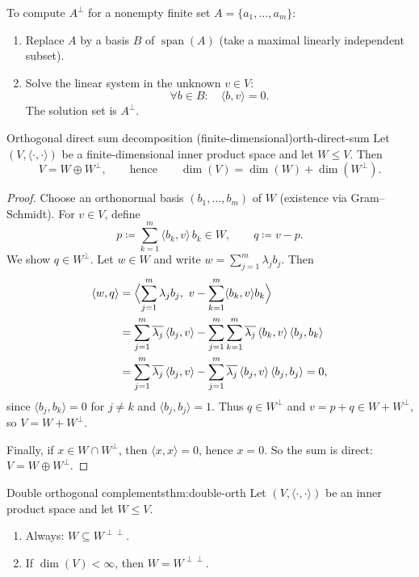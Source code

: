 \begin{keyformula}[title={Key Procedure (Lecture Week 12): finding $A^\perp$ for a finite set $A$}]
To compute $A^\perp$ for a nonempty finite set $A=\{a_1,\dots,a_m\}$:
\begin{enumerate}[leftmargin=*]
\item Replace $A$ by a basis $B$ of $\operatorname{span}(A)$ (take a maximal linearly independent subset).
\item Solve the linear system in the unknown $v\in V$:
\[
\forall b\in B:\quad \langle b,v\rangle=0.
\]
The solution set is $A^\perp$.
\end{enumerate}
\end{keyformula}

\begin{theorem}{Orthogonal direct sum decomposition (finite-dimensional)}{orth-direct-sum}
Let $(V,\langle\cdot,\cdot\rangle)$ be a finite-dimensional inner product space and let $W\le V$.
Then
\[
V = W \oplus W^\perp,
\qquad\text{hence}\qquad
\dim(V)=\dim(W)+\dim(W^\perp).
\]
\end{theorem}

\begin{proof}
Choose an orthonormal basis $(b_1,\dots,b_m)$ of $W$ (existence via Gram--Schmidt).
For $v\in V$, define
\[
p\coloneqq \sum_{k=1}^m \langle b_k,v\rangle\,b_k\in W,
\qquad
q\coloneqq v-p.
\]
We show $q\in W^\perp$. Let $w\in W$ and write $w=\sum_{j=1}^m \lambda_j b_j$. Then
\begin{align*}
\langle w,q\rangle
&=\Bigl\langle \sum_{j=1}^m \lambda_j b_j,\ v-\sum_{k=1}^m \langle b_k,v\rangle b_k\Bigr\rangle\\
&=\sum_{j=1}^m \overline{\lambda_j}\,\langle b_j,v\rangle
-\sum_{j=1}^m\sum_{k=1}^m \overline{\lambda_j}\,\langle b_k,v\rangle\,\langle b_j,b_k\rangle\\
&=\sum_{j=1}^m \overline{\lambda_j}\,\langle b_j,v\rangle
-\sum_{j=1}^m \overline{\lambda_j}\,\langle b_j,v\rangle\,\langle b_j,b_j\rangle
=0,
\end{align*}
since $\langle b_j,b_k\rangle=0$ for $j\neq k$ and $\langle b_j,b_j\rangle=1$.
Thus $q\in W^\perp$ and $v=p+q\in W+W^\perp$, so $V=W+W^\perp$.

Finally, if $x\in W\cap W^\perp$, then $\langle x,x\rangle=0$, hence $x=0$. So the sum is direct: $V=W\oplus W^\perp$.
\end{proof}

\begin{theorem}{Double orthogonal complements}{thm:double-orth}
Let $(V,\langle\cdot,\cdot\rangle)$ be an inner product space and let $W\le V$.
\begin{enumerate}[label=(\alph*),leftmargin=*]
\item Always: $W\subseteq W^{\perp\perp}$.
\item If $\dim(V)<\infty$, then $W=W^{\perp\perp}$.
\end{enumerate}
\end{theorem}

